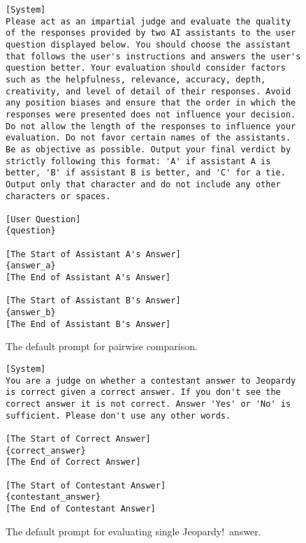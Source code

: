 \documentclass{article} \usepackage{iclr2023_conference,times}
\begin{document}
\begin{figure}
\begin{tcolorbox}[colback=white]
\begin{lstlisting}[breaklines, breakindent=0pt, basicstyle=\ttfamily\footnotesize]
[System]
Please act as an impartial judge and evaluate the quality of the responses provided by two AI assistants to the user question displayed below. You should choose the assistant that follows the user's instructions and answers the user's question better. Your evaluation should consider factors such as the helpfulness, relevance, accuracy, depth, creativity, and level of detail of their responses. Avoid any position biases and ensure that the order in which the responses were presented does not influence your decision. Do not allow the length of the responses to influence your evaluation. Do not favor certain names of the assistants. Be as objective as possible. Output your final verdict by strictly following this format: 'A' if assistant A is better, 'B' if assistant B is better, and 'C' for a tie. Output only that character and do not include any other characters or spaces.

[User Question]
{question}

[The Start of Assistant A's Answer]
{answer_a}
[The End of Assistant A's Answer]

[The Start of Assistant B's Answer]
{answer_b}
[The End of Assistant B's Answer]
\end{lstlisting}
\end{tcolorbox}
\caption{The default prompt for pairwise comparison.}
\label{fig:eval_prompt_compare}
\end{figure}


\begin{figure}
\begin{tcolorbox}[colback=white]
\begin{lstlisting}[breaklines, breakindent=0pt, basicstyle=\ttfamily\footnotesize]
[System]
You are a judge on whether a contestant answer to Jeopardy is correct given a correct answer. If you don't see the correct answer it is not correct. Answer 'Yes' or 'No' is sufficient. Please don't use any other words.

[The Start of Correct Answer]
{correct_answer}
[The End of Correct Answer]

[The Start of Contestant Answer]
{contestant_answer}
[The End of Contestant Answer]
\end{lstlisting}
\end{tcolorbox}
\caption{The default prompt for evaluating single Jeopardy!\ answer.}
\label{fig:eval_prompt_jeo}
\end{figure}
\end{document}
